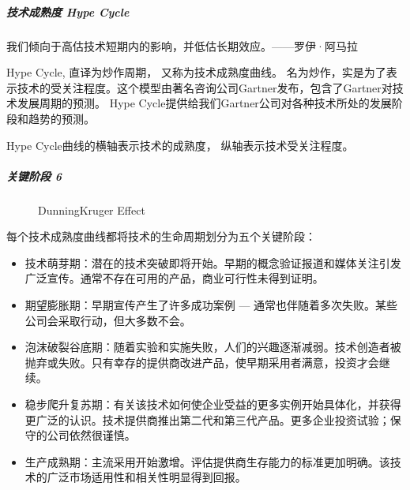 \documentclass[letterpaper,11pt,english]{sphinxmanual}
\begin{document}
\subparagraph{技术成熟度 Hype Cycle}
\label{\detokenize{chapter_knowledge/industry_analysis:hype-cycle}}
我们倾向于高估技术短期内的影响，并低估长期效应。——罗伊·阿马拉

Hype Cycle, 直译为炒作周期， 又称为技术成熟度曲线。
名为炒作，实是为了表示技术的受关注程度。这个模型由著名咨询公司Gartner发布，包含了Gartner对技术发展周期的预测。
Hype Cycle提供给我们Gartner公司对各种技术所处的发展阶段和趋势的预测。

Hype Cycle曲线的横轴表示技术的成熟度， 纵轴表示技术受关注程度。


\subparagraph{关键阶段 6\sphinxfootnotemark[431]}
\label{\detokenize{chapter_knowledge/industry_analysis:id11}}%
\begin{footnotetext}[431]\sphinxAtStartFootnote
{}
%
\end{footnotetext}\ignorespaces 
\begin{figure}[H]
\centering
\capstart

\noindent{}
\caption{Dunning\sphinxhyphen{}Kruger Effect}\label{\detokenize{chapter_knowledge/industry_analysis:id28}}\end{figure}

\begin{center}\end{center} 

每个技术成熟度曲线都将技术的生命周期划分为五个关键阶段：
\begin{itemize}
\item {} 
技术萌芽期：潜在的技术突破即将开始。早期的概念验证报道和媒体关注引发广泛宣传。通常不存在可用的产品，商业可行性未得到证明。

\item {} 
期望膨胀期：早期宣传产生了许多成功案例 —
通常也伴随着多次失败。某些公司会采取行动，但大多数不会。

\item {} 
泡沫破裂谷底期：随着实验和实施失败，人们的兴趣逐渐减弱。技术创造者被抛弃或失败。只有幸存的提供商改进产品，使早期采用者满意，投资才会继续。

\item {} 
稳步爬升复苏期：有关该技术如何使企业受益的更多实例开始具体化，并获得更广泛的认识。技术提供商推出第二代和第三代产品。更多企业投资试验；保守的公司依然很谨慎。

\item {} 
生产成熟期：主流采用开始激增。评估提供商生存能力的标准更加明确。该技术的广泛市场适用性和相关性明显得到回报。

\end{itemize}
\end{document}

